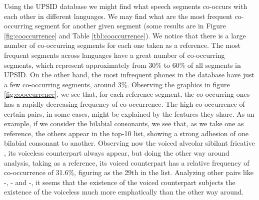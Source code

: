 Using the UPSID database we might find what speech segments co-occurs with each other in
different languages. 
We may find what are the most frequent co-occurring segment for another given segment 
(some results are in Figure \ref{fig:cooccurrence} and Table \ref{tbl:cooccurrence}). 
We notice that there is a large number of co-occurring segments for each one taken as a reference. 
The most frequent segments across languages have a great number of co-occurring segments, 
which represent approximately from 30\% to 60\% of all segments in UPSID. On the other hand, 
the most infrequent phones in the database have just a few co-occurring segments, around 3\%. 
Observing the graphics in figure \ref{fig:cooccurrence}, we see that, for each reference segment, 
the co-occurring ones has a rapidly decreasing frequency of co-occurrence. 
The high co-occurrence of certain pairs, in some cases, might be explained by the features they share. 
As an example, if we consider the bilabial consonants, we see that, as we take one as reference, 
the others appear in the top-10 list, showing a strong adhesion of one bilabial consonant to another. 
Observing now the voiced alveolar sibilant fricative \textipa{[z]}, its voiceless counterpart always appear, 
but doing the other way around analysis, taking \textipa{[s]} as a reference, its voiced counterpart \textipa{[z]} 
has a relative frequency of co-occurrence of 31.6\%, figuring as the 29th in the list. 
Analyzing other pairs like \textipa{[t]}-\textipa{[d]}, \textipa{[k]}-\textipa{[g]} and \textipa{[p]}-\textipa{[b]}, 
it seems that the existence of the voiced counterpart subjects the existence of the voiceless much more 
emphatically than the other way around.



